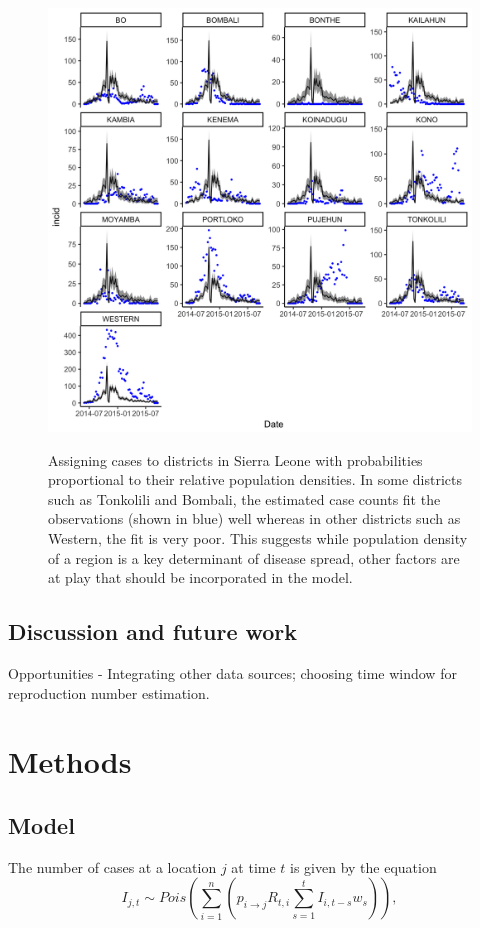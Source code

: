 \documentclass[a4paper,12pt]{article}
\begin{document}
 \begin{figure}
   \centering
   \includegraphics[width = \textwidth]{figures/disaggregation_1.png}
   \label{fig:disaggregate1}
   \caption{Assigning cases to districts in Sierra Leone with probabilities
     proportional to their relative population densities. In some
     districts such as Tonkolili and Bombali, the estimated case counts fit
     the observations (shown in blue) well whereas in other districts such as Western,
   the fit is very poor. This suggests while population density of a
   region is a key determinant of disease spread, other factors are at
 play that should be incorporated in the model. }
 \end{figure}

 \subsection{Discussion and future work}

 Opportunities - Integrating other data sources; choosing time
 window for reproduction number estimation.

 \section{Methods}
 \subsection{Model}
 The number of cases at a location \(j\) at time \(t\) is given by the equation
\[
  I_{j, t} \sim Pois\left( \sum_{i = 1}^{n} {\left( p_{i \rightarrow j}
  R_{t, i} \sum_{s = 1}^{t}{I_{i, t - s} w_{s}}\right)} \right),
\]
\end{document}
